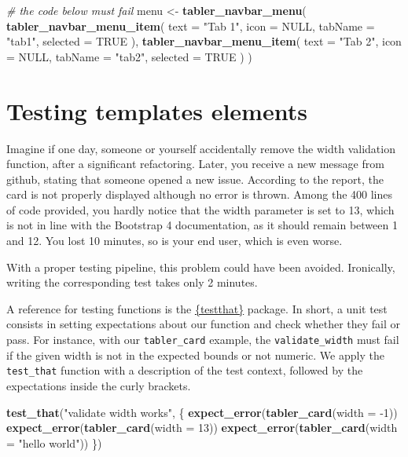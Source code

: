 \documentclass[
]{book}
\newenvironment{Shaded}{\begin{snugshade}}{\end{snugshade}}
\newcommand{\CommentTok}[1]{\textcolor[rgb]{0.56,0.35,0.01}{\textit{#1}}}
\newcommand{\DataTypeTok}[1]{\textcolor[rgb]{0.13,0.29,0.53}{#1}}
\newcommand{\DecValTok}[1]{\textcolor[rgb]{0.00,0.00,0.81}{#1}}
\newcommand{\KeywordTok}[1]{\textcolor[rgb]{0.13,0.29,0.53}{\textbf{#1}}}
\newcommand{\NormalTok}[1]{#1}
\newcommand{\OtherTok}[1]{\textcolor[rgb]{0.56,0.35,0.01}{#1}}
\newcommand{\StringTok}[1]{\textcolor[rgb]{0.31,0.60,0.02}{#1}}
\begin{document}
\begin{Shaded}
\begin{Highlighting}[]
\CommentTok{# the code below must fail}
\NormalTok{menu <-}\StringTok{ }\KeywordTok{tabler_navbar_menu}\NormalTok{(}
  \KeywordTok{tabler_navbar_menu_item}\NormalTok{(}
    \DataTypeTok{text =} \StringTok{"Tab 1"}\NormalTok{,}
    \DataTypeTok{icon =} \OtherTok{NULL}\NormalTok{,}
    \DataTypeTok{tabName =} \StringTok{"tab1"}\NormalTok{,}
    \DataTypeTok{selected =} \OtherTok{TRUE}
\NormalTok{  ),}
  \KeywordTok{tabler_navbar_menu_item}\NormalTok{(}
    \DataTypeTok{text =} \StringTok{"Tab 2"}\NormalTok{,}
    \DataTypeTok{icon =} \OtherTok{NULL}\NormalTok{,}
    \DataTypeTok{tabName =} \StringTok{"tab2"}\NormalTok{,}
    \DataTypeTok{selected =} \OtherTok{TRUE}
\NormalTok{  )}
\NormalTok{)}
\end{Highlighting}
\end{Shaded}

\hypertarget{testing-templates-elements}{%
\section{Testing templates elements}\label{testing-templates-elements}}

Imagine if one day, someone or yourself accidentally remove the width validation function, after a significant refactoring. Later, you receive a new message from github, stating that someone opened a new issue. According to the report, the card is not properly displayed although no error is thrown. Among the 400 lines of code provided, you hardly notice that the width parameter is set to 13, which is not in line with the Bootstrap 4 documentation, as it should remain between 1 and 12. You lost 10 minutes, so is your end user, which is even worse.

With a proper testing pipeline, this problem could have been avoided. Ironically, writing the corresponding test takes only 2 minutes.

A reference for testing functions is the \href{https://testthat.r-lib.org/index.html}{\{testthat\}} package. In short, a unit test consists in setting expectations about our function and check whether they fail or pass. For instance, with our \texttt{tabler\_card} example, the \texttt{validate\_width} must fail if the given width is not in the expected bounds or not numeric. We apply the \texttt{test\_that} function with a description of the test context, followed by the expectations inside the curly brackets.

\begin{Shaded}
\begin{Highlighting}[]
\KeywordTok{test_that}\NormalTok{(}\StringTok{"validate width works"}\NormalTok{, \{}
  \KeywordTok{expect_error}\NormalTok{(}\KeywordTok{tabler_card}\NormalTok{(}\DataTypeTok{width =} \DecValTok{-1}\NormalTok{))}
  \KeywordTok{expect_error}\NormalTok{(}\KeywordTok{tabler_card}\NormalTok{(}\DataTypeTok{width =} \DecValTok{13}\NormalTok{))}
  \KeywordTok{expect_error}\NormalTok{(}\KeywordTok{tabler_card}\NormalTok{(}\DataTypeTok{width =} \StringTok{"hello world"}\NormalTok{))}
\NormalTok{\})}
\end{Highlighting}
\end{Shaded}
\end{document}
